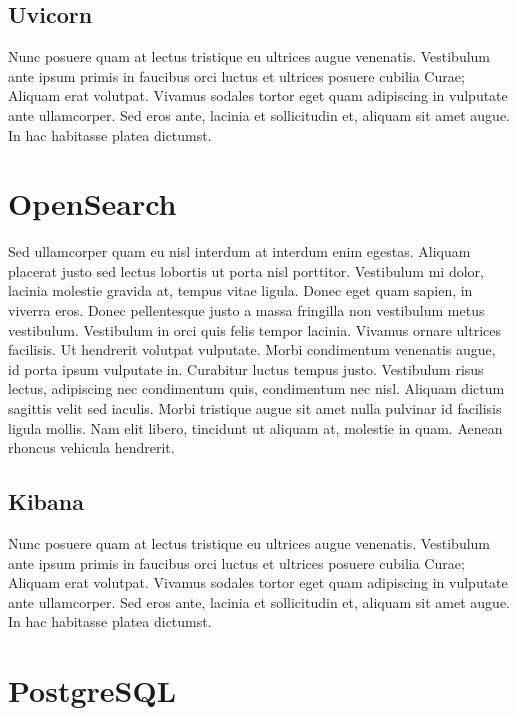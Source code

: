 \subsection{Uvicorn}

Nunc posuere quam at lectus tristique eu ultrices augue venenatis. Vestibulum ante ipsum primis in faucibus orci luctus et ultrices posuere cubilia Curae; Aliquam erat volutpat. Vivamus sodales tortor eget quam adipiscing in vulputate ante ullamcorper. Sed eros ante, lacinia et sollicitudin et, aliquam sit amet augue. In hac habitasse platea dictumst.


\section{OpenSearch}

Sed ullamcorper quam eu nisl interdum at interdum enim egestas. Aliquam placerat justo sed lectus lobortis ut porta nisl porttitor. Vestibulum mi dolor, lacinia molestie gravida at, tempus vitae ligula. Donec eget quam sapien, in viverra eros. Donec pellentesque justo a massa fringilla non vestibulum metus vestibulum. Vestibulum in orci quis felis tempor lacinia. Vivamus ornare ultrices facilisis. Ut hendrerit volutpat vulputate. Morbi condimentum venenatis augue, id porta ipsum vulputate in. Curabitur luctus tempus justo. Vestibulum risus lectus, adipiscing nec condimentum quis, condimentum nec nisl. Aliquam dictum sagittis velit sed iaculis. Morbi tristique augue sit amet nulla pulvinar id facilisis ligula mollis. Nam elit libero, tincidunt ut aliquam at, molestie in quam. Aenean rhoncus vehicula hendrerit.

\subsection{Kibana}

Nunc posuere quam at lectus tristique eu ultrices augue venenatis. Vestibulum ante ipsum primis in faucibus orci luctus et ultrices posuere cubilia Curae; Aliquam erat volutpat. Vivamus sodales tortor eget quam adipiscing in vulputate ante ullamcorper. Sed eros ante, lacinia et sollicitudin et, aliquam sit amet augue. In hac habitasse platea dictumst.


\section{PostgreSQL}

